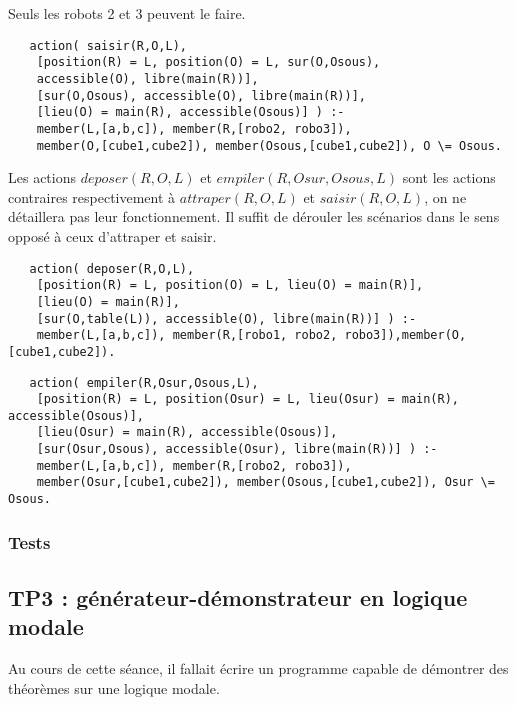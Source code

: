 \documentclass[a4paper,10pt]{article}
\begin{document}
   Seuls les robots 2 et 3 peuvent le faire.
   \begin{lstlisting}
   action( saisir(R,O,L),
	[position(R) = L, position(O) = L, sur(O,Osous), 
	accessible(O), libre(main(R))],
	[sur(O,Osous), accessible(O), libre(main(R))],
	[lieu(O) = main(R), accessible(Osous)] ) :-
	member(L,[a,b,c]), member(R,[robo2, robo3]), 
	member(O,[cube1,cube2]), member(Osous,[cube1,cube2]), O \= Osous.
   \end{lstlisting}
   Les actions $deposer(R,O,L)$ et $empiler(R,Osur,Osous,L)$ sont les actions contraires respectivement à $attraper(R,O,L)$ et $saisir(R,O,L)$, 
   on ne détaillera pas leur fonctionnement. Il suffit de d\'{e}rouler les sc\'{e}narios dans le sens oppos\'{e} \`{a} ceux d'attraper et saisir.
   \begin{lstlisting}
   action( deposer(R,O,L),
	[position(R) = L, position(O) = L, lieu(O) = main(R)],
	[lieu(O) = main(R)],
	[sur(O,table(L)), accessible(O), libre(main(R))] ) :-
	member(L,[a,b,c]), member(R,[robo1, robo2, robo3]),member(O,[cube1,cube2]).
   \end{lstlisting}
   \begin{lstlisting}
   action( empiler(R,Osur,Osous,L),
	[position(R) = L, position(Osur) = L, lieu(Osur) = main(R), accessible(Osous)],
	[lieu(Osur) = main(R), accessible(Osous)],
	[sur(Osur,Osous), accessible(Osur), libre(main(R))] ) :-
	member(L,[a,b,c]), member(R,[robo2, robo3]), 
	member(Osur,[cube1,cube2]), member(Osous,[cube1,cube2]), Osur \= Osous.
   \end{lstlisting}
   \subsubsection{Tests}
   
  \subsection{TP3 : g\'{e}n\'{e}rateur-d\'{e}monstrateur en logique modale}
  Au cours de cette s\'{e}ance, il fallait \'{e}crire un programme capable de d\'{e}montrer des th\'{e}or\`{e}mes sur une logique modale.
  
\end{document}
